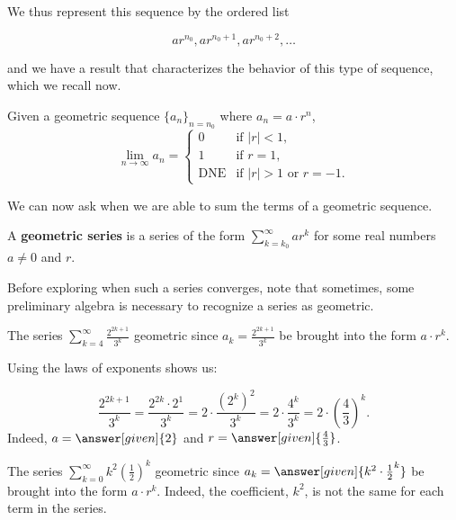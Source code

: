 \documentclass{ximera}
\begin{document}
We thus represent this sequence by the ordered list

\[
ar^{n_0} , ar^{n_0+1}, ar^{n_0+2}, \ldots
\]

and we have a result that characterizes the behavior of this type of sequence, which we recall now.


\begin{theorem}
  Given a geometric sequence $\{a_n\}_{n=n_0}$ where $a_n = a \cdot r^{n}$,
  \[
  \lim_{n\to\infty} a_n =
  \begin{cases}
    0 &\text{if $|r|<1$,}\\
    1 &\text{if $r=1$,}\\
    \text{DNE} &\text{if $|r|>1$ or $r=-1$.}
  \end{cases}
  \]
\end{theorem}

We can now ask when we are able to sum the terms of a geometric sequence.

\begin{definition}
  A \textbf{geometric series} is a series of the form $\sum\limits_{k=k_0}^\infty ar^k$
  for some real numbers $a \ne 0$ and $r$.
\end{definition}

Before exploring when such a series converges, note that sometimes, some preliminary algebra is necessary to recognize a series as geometric.

\begin{example}
The series $\sum\limits_{k=4}^\infty \frac{2^{2k+1}}{3^k}$  geometric since $a_k =\frac{2^{2k+1}}{3^k}$  be brought into the form $a \cdot r^k$.  

Using the laws of exponents shows us:

\[
\frac{2^{2k+1}}{3^k} = \frac{2^{2k} \cdot 2^1}{3^k}= 2 \cdot \frac{\left(2^{k}\right)^2}{3^k} = 2 \cdot \frac{4^k}{3^k} = 2 \cdot \left(\frac{4}{3}\right)^k.
\]
Indeed, $a= \answer[given]{2}$ and $r = \answer[given]{\frac{4}{3}}$.
\end{example}

\begin{example}
The series $\sum\limits_{k=0}^\infty k^2 \left(\frac{1}{2}\right)^k$  geometric since $a_k = \answer[given]{k^2 \cdot \frac{1}{2}^k}$  be brought into the form $a \cdot r^k$.  Indeed, the coefficient, $k^2$, is not the same for each term in the series.
\end{example}
\end{document}
